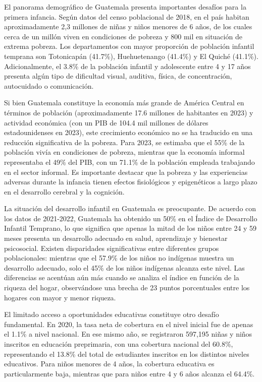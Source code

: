 \documentclass[11pt,letterpaper]{report}
\begin{document}
El panorama demográfico de Guatemala presenta importantes desafíos para la
primera infancia. Según datos del censo poblacional de 2018, en el país habitan
aproximadamente 2,3 millones de niñas y niños menores de 6 años, de los cuales
cerca de un millón viven en condiciones de pobreza y 800 mil en situación de
extrema pobreza. \cite{INE} Los departamentos con mayor proporción de población
infantil temprana son Totonicapán (41.7\%), Huehuetenango (41.4\%) y El Quiché
(41.1\%). \cite{UNICEFAtlas} Adicionalmente, el 3.8\% de la población infantil
y adolescente entre 4 y 17 años presenta algún tipo de dificultad visual,
auditiva, física, de concentración, autocuidado o comunicación. \cite{INE}

Si bien Guatemala constituye la economía más grande de América Central en
términos de población (aproximadamente 17.6 millones de habitantes en 2023) y
actividad económica (con un PIB de 104.4 mil millones de dólares
estadounidenses en 2023), este crecimiento económico no se ha traducido en una
reducción significativa de la pobreza. Para 2023, se estimaba que el 55\% de la
población vivía en condiciones de pobreza, mientras que la economía informal
representaba el 49\% del PIB, con un 71.1\% de la población empleada trabajando
en el sector informal. \cite{WorldBankGuate} Es importante destacar que la
pobreza y las experiencias adversas durante la infancia tienen efectos
fisiológicos y epigenéticos a largo plazo en el desarrollo cerebral y la
cognición. \cite{Luby_2015} \cite{Noble_2015}

La situación del desarrollo infantil en Guatemala es preocupante. De acuerdo
con los datos de 2021-2022, Guatemala ha obtenido un 50\% en el Índice de
Desarrollo Infantil Temprano, lo que significa que apenas la mitad de los niños
entre 24 y 59 meses presenta un desarrollo adecuado en salud, aprendizaje y
bienestar psicosocial. Existen disparidades significativas entre diferentes
grupos poblacionales: mientras que el 57.9\% de los niños no indígenas muestra
un desarrollo adecuado, solo el 45\% de los niños indígenas alcanza este nivel.
\cite{SESAN2022} Las diferencias se acentúan aún más cuando se analiza el
índice en función de la riqueza del hogar, observándose una brecha de 23 puntos
porcentuales entre los hogares con mayor y menor riqueza. \cite{UNICEFGuate}

El limitado acceso a oportunidades educativas constituye otro desafío
fundamental. En 2020, la tasa neta de cobertura en el nivel inicial fue de
apenas el 1.1\% a nivel nacional. En ese mismo año, se registraron 597,195
niñas y niños inscritos en educación preprimaria, con una cobertura nacional
del 60.8\%, representando el 13.8\% del total de estudiantes inscritos en
los distintos niveles educativos. \cite{PoliticaInfanciaGuate} Para niños
menores de 4 años, la cobertura educativa es particularmente baja, mientras que
para niños entre 4 y 6 años alcanza el 64.4\%. \cite{MineducEstadistica}
\end{document}

